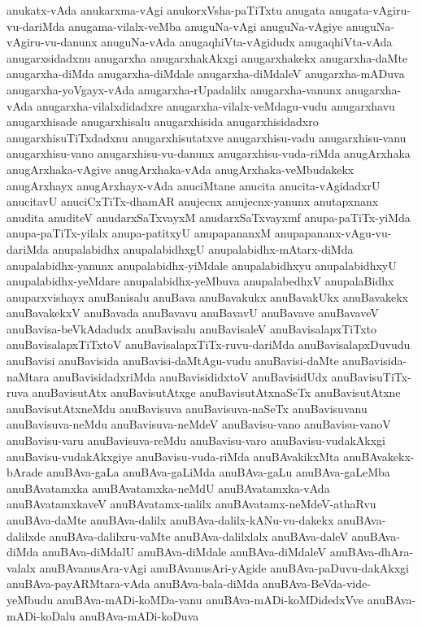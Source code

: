 {anukatx-vAda
anukarxma-vAgi
anukorxVsha-paTiTxtu
anugata
anugata-vAgiru-vu-dariMda
anugama-vilalx-veMba
anuguNa-vAgi
anuguNa-vAgiye
anuguNa-vAgiru-vu-danunx
anuguNa-vAda
anugaqhiVta-vAgidudx
anugaqhiVta-vAda
anugarxsidadxnu
anugarxha
anugarxhakAkxgi
anugarxhakekx
anugarxha-daMte
anugarxha-diMda
anugarxha-diMdale
anugarxha-diMdaleV
anugarxha-mADuva
anugarxha-yoVgayx-vAda
anugarxha-rUpadalilx
anugarxha-vanunx
anugarxha-vAda
anugarxha-vilalxdidadxre
anugarxha-vilalx-veMdagu-vudu
anugarxhavu
anugarxhisade
anugarxhisalu
anugarxhisida
anugarxhisidadxro
anugarxhisuTiTxdadxnu
anugarxhisutatxve
anugarxhisu-vadu
anugarxhisu-vanu
anugarxhisu-vano
anugarxhisu-vu-danunx
anugarxhisu-vuda-riMda
anugArxhaka
anugArxhaka-vAgive
anugArxhaka-vAda
anugArxhaka-veMbudakekx
anugArxhayx
anugArxhayx-vAda
anuciMtane
anucita
anucita-vAgidadxrU
anucitavU
anuciCxTiTx-dhamAR
anujecnx
anujecnx-yanunx
anutapxnanx
anudita
anuditeV
anudarxSaTxvayxM
anudarxSaTxvayxmf
anupa-paTiTx-yiMda
anupa-paTiTx-yilalx
anupa-patitxyU
anupapananxM
anupapananx-vAgu-vu-dariMda
anupalabidhx
anupalabidhxgU
anupalabidhx-mAtarx-diMda
anupalabidhx-yanunx
anupalabidhx-yiMdale
anupalabidhxyu
anupalabidhxyU
anupalabidhx-yeMdare
anupalabidhx-yeMbuva
anupalabedhxV
anupalaBidhx
anuparxvishayx
anuBanisalu
anuBava
anuBavakukx
anuBavakUkx
anuBavakekx
anuBavakekxV
anuBavada
anuBavavu
anuBavavU
anuBavave
anuBavaveV
anuBavisa-beVkAdadudx
anuBavisalu
anuBavisaleV
anuBavisalapxTiTxto
anuBavisalapxTiTxtoV
anuBavisalapxTiTx-ruvu-dariMda
anuBavisalapxDuvudu
anuBavisi
anuBavisida
anuBavisi-daMtAgu-vudu
anuBavisi-daMte
anuBavisida-naMtara
anuBavisidadxriMda
anuBavisididxtoV
anuBavisidUdx
anuBavisuTiTx-ruva
anuBavisutAtx
anuBavisutAtxge
anuBavisutAtxnaSeTx
anuBavisutAtxne
anuBavisutAtxneMdu
anuBavisuva
anuBavisuva-naSeTx
anuBavisuvanu
anuBavisuva-neMdu
anuBavisuva-neMdeV
anuBavisu-vano
anuBavisu-vanoV
anuBavisu-varu
anuBavisuva-reMdu
anuBavisu-varo
anuBavisu-vudakAkxgi
anuBavisu-vudakAkxgiye
anuBavisu-vuda-riMda
anuBAvakikxMta
anuBAvakekx-bArade
anuBAva-gaLa
anuBAva-gaLiMda
anuBAva-gaLu
anuBAva-gaLeMba
anuBAvatamxka
anuBAvatamxka-neMdU
anuBAvatamxka-vAda
anuBAvatamxkaveV
anuBAvatamx-nalilx
anuBAvatamx-neMdeV-athaRvu
anuBAva-daMte
anuBAva-dalilx
anuBAva-dalilx-kANu-vu-dakekx
anuBAva-dalilxde
anuBAva-dalilxru-vaMte
anuBAva-dalilxlalx
anuBAva-daleV
anuBAva-diMda
anuBAva-diMdalU
anuBAva-diMdale
anuBAva-diMdaleV
anuBAva-dhAra-valalx
anuBAvanusAra-vAgi
anuBAvanusAri-yAgide
anuBAva-paDuvu-dakAkxgi
anuBAva-payARMtara-vAda
anuBAva-bala-diMda
anuBAva-BeVda-vide-yeMbudu
anuBAva-mADi-koMDa-vanu
anuBAva-mADi-koMDidedxVve
anuBAva-mADi-koDalu
anuBAva-mADi-koDuva
}
